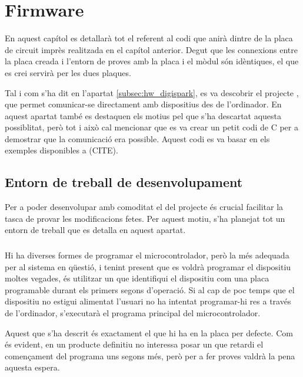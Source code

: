 \chapter{Firmware}

En aquest capítol es detallarà tot el referent al codi que anirà dintre de la
placa de circuit imprès realitzada en el capítol anterior. Degut que les
connexions entre la placa creada i l'entorn de proves amb la placa 
i el mòdul  són idèntiques, el  que es crei servirà
per les dues plaques.

Tal i com s'ha dit en l'apartat \ref{subsec:hw_digispark}, es va descobrir
el projecte , que permet comunicar-se directament amb
dispositius  des de l'ordinador. En aquest apartat també es destaquen
els motius pel que s'ha descartat aquesta possiblitat, però tot i això cal
mencionar que es va crear un petit codi de C per a demostrar que la comunicació
era possible. Aquest codi es va basar en els exemples disponibles a (CITE).

\section{Entorn de treball de desenvolupament}

Per a poder desenvolupar amb comoditat el  del projecte és crucial
facilitar la tasca de provar les modificacions fetes. Per aquest motiu, s'ha
planejat tot un entorn de treball que es detalla en aquest apartat.

\subsection{}
\label{subsec:bootloader}

Hi ha diverses formes de programar el microcontrolador, però la més adequada
per al sistema en qüestió, i tenint present que es voldrà programar el dispositiu
moltes vegades, és utilitzar un  que identifiqui el dispositiu
com una placa programable durant els primers segons d'operació. Si al cap de
poc temps que el dispositiu no estigui alimentat l'usuari no ha intentat
programar-hi res a través de l'ordinador, s'executarà el programa principal
del microcontrolador.

Aquest  que s'ha descrit és exactament el que hi ha en la
placa  per defecte. Com és evident, en un producte definitiu no
interessa posar un  que retardi el començament del programa
uns segons més, però per a fer proves valdrà la pena aquesta espera.

